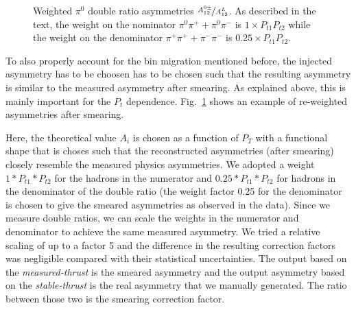 \begin{figure}[H]
  \caption{Weighted $\pi^0$ double ratio asymmetries $\nicefrac{A^{0\pm}_{12}}{A^L_{12}}$. As described in the text, the weight on the nominator  $\pi^0\pi^++\pi^0\pi^-$ is $1\times P_{t1}P_{t2}$ while the weight on the denominator $\pi^+\pi^++\pi^-\pi^- $ is $0.25\times P_{t1}P_{t2}$.}
  \label{fig:weightpi0}
\end{figure}

To also properly account for the bin migration mentioned before, the injected asymmetry has to be choosen has to be chosen such that the resulting asymmetry is similar to the measured asymmetry after smearing. As explained above, this is mainly important for the $P_t$ dependence. 
Fig.~\ref{fig:weightpi0} shows an example of re-weighted asymmetries after smearing.

  Here, the theoretical value $A_{i}$ is chosen as a function of $P_T$ with a functional shape that is choses such that the reconstructed asymmetries (after smearing) closely resemble the measured physics asymmetries.
We adopted  a weight $1*P_{t1}*P_{t2}$ for the hadrons in the numerator and $0.25*P_{t1}*P_{t2}$ for hadrons in the denominator of the double ratio (the weight factor 0.25 for the denominator is chosen to
give the smeared asymmetries as observed in the data). 
 Since we measure double ratios, we can scale the weights in the numerator and denominator to achieve the same measured asymmetry. We tried a relative scaling of up to a factor 5 and 
the difference in the resulting correction factors was negligible compared with their statistical uncertainties.
 The output based on the {\em measured-thrust} is the smeared asymmetry and the output asymmetry based on the {\em stable-thrust} is the real asymmetry that we manually generated. The ratio between those two is the smearing correction factor.
 

